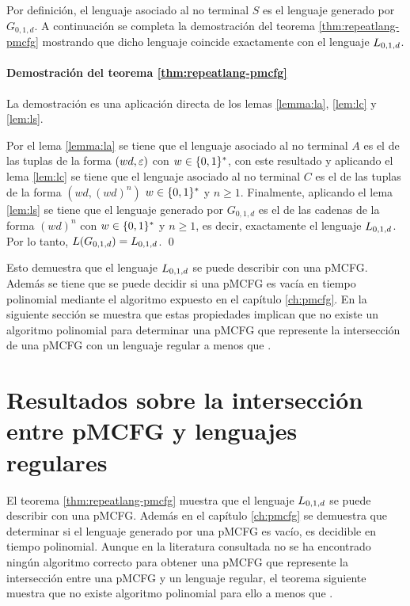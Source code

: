 Por definición, el lenguaje asociado al no terminal $S$ es el lenguaje generado por $G_{0, 1, d}$. A continuación se completa la demostración del teorema \ref{thm:repeatlang-pmcfg} mostrando que dicho lenguaje coincide exactamente con el lenguaje $L_{0,1,d}$.


\paragraph{Demostración del teorema \ref{thm:repeatlang-pmcfg}} La demostración es una aplicación directa de los lemas \ref{lemma:la}, \ref{lem:lc} y \ref{lem:ls}.

Por el lema \ref{lemma:la} se tiene que el lenguaje asociado al no terminal $A$ es el de las tuplas de la forma $(wd, \varepsilon)$ con $w \in \{0, 1\}^*$, con este resultado y aplicando el lema \ref{lem:lc} se tiene que el lenguaje asociado al no terminal $C$ es el de las tuplas de la forma $(wd, (wd)^n)$ $w \in \{0, 1\}^*$ y $n \geq 1$. Finalmente, aplicando el lema \ref{lem:ls} se tiene que el lenguaje generado por $G_{0, 1, d}$ es el de las cadenas de la forma $(wd)^n$ con $w \in \{0, 1\}^*$ y $n \geq 1$, es decir, exactamente el lenguaje $L_{0,1,d}$. Por lo tanto, $L(G_{0, 1, d}) = L_{0,1,d}$. \qed


Esto demuestra que el lenguaje $L_{0,1,d}$ se puede describir con una pMCFG. Además se tiene que se puede decidir si una pMCFG es vacía en tiempo polinomial mediante el algoritmo expuesto en el capítulo \ref{ch:pmcfg}. En la siguiente sección se muestra que estas propiedades implican que no existe un algoritmo polinomial para determinar una pMCFG que represente la intersección de una pMCFG con un lenguaje regular a menos que \pnp.

\section{Resultados sobre la intersección entre pMCFG y lenguajes regulares}
\label{sec:wplus-results}

El teorema \ref{thm:repeatlang-pmcfg} muestra que el lenguaje $L_{0,1,d}$ se puede describir con una pMCFG. Además en el capítulo \ref{ch:pmcfg} se demuestra que determinar si el lenguaje generado por una pMCFG es vacío, es decidible en tiempo polinomial. Aunque en la literatura consultada no se ha encontrado ningún algoritmo correcto para obtener una pMCFG que represente la intersección entre una pMCFG y un lenguaje regular, el teorema siguiente muestra que no existe algoritmo polinomial para ello a menos que \pnp.

